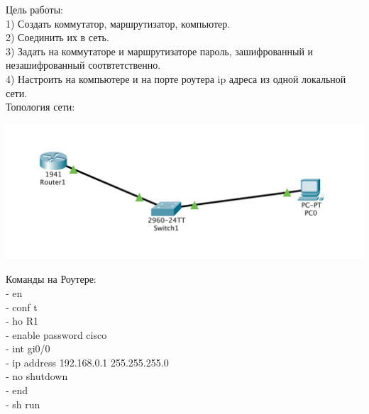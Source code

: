 \documentclass[a4paper,14pt]{extarticle}
\begin{document}
    Цель работы:\\ 
    1) Создать коммутатор, маршрутизатор, компьютер.\\
    2) Соединить их в сеть.\\ 
    3) Задать на коммутаторе и маршрутизаторе пароль, зашифрованный и 
    незашифрованный соотвтетственно.\\
    4) Настроить на компьютере и на порте роутера ip адреса из одной 
    локальной сети.\\
    
    Топология сети:
    \begin{center}
        \includegraphics[scale=0.7]{net.png}
    \end{center}

    Команды на Роутере:\\
    - en\\
    - conf t\\
    - ho R1\\
    - enable password cisco\\
    - int gi0/0\\
    - ip address 192.168.0.1 255.255.255.0\\
    - no shutdown\\
    - end\\
    - sh run\\
    
\end{document}

